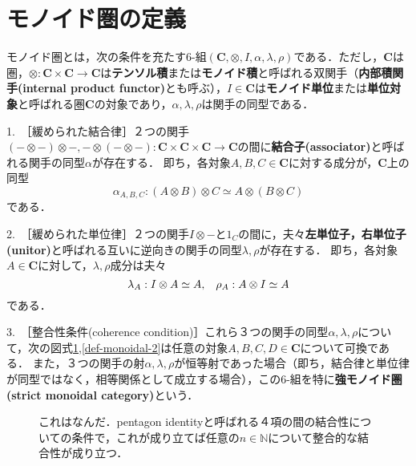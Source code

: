 \documentclass[uplatex, dvipdfmx]{jsreport}
\begin{document}
\section{モノイド圏の定義}
\begin{definition}\rm{}
    モノイド圏とは，次の条件を充たす6-組$(\mathbf{C},\otimes,I,\alpha,\lambda,\rho)$である．ただし，$\mathbf{C}$は圏，$\otimes:\mathbf{C}\times \mathbf{C}\to \mathbf{C}$は\textbf{テンソル積}または\textbf{モノイド積}と呼ばれる双関手（\textbf{内部積関手(internal product functor)}とも呼ぶ），$I\in \mathbf{C}$は\textbf{モノイド単位}または\textbf{単位対象}と呼ばれる圏$\mathbf{C}$の対象であり，$\alpha,\lambda,\rho$は関手の同型である．

    1.\, ［緩められた結合律］２つの関手$(-\otimes -)\otimes -,-\otimes (-\otimes -):\mathbf{C}\times \mathbf{C}\times \mathbf{C}\to \mathbf{C}$の間に\textbf{結合子(associator)}と呼ばれる関手の同型$\alpha$が存在する．
    即ち，各対象$A,B,C\in\mathbf{C}$に対する成分が，$\mathbf{C}$上の同型$$\alpha_{A,B,C}:(A\otimes B)\otimes C\simeq A\otimes (B\otimes C)$$である．

    2.\, ［緩められた単位律］２つの関手$I\otimes -$と$1_C$の間に，夫々\textbf{左単位子，右単位子(unitor)}と呼ばれる互いに逆向きの関手の同型$\lambda,\rho$が存在する．
    即ち，各対象$A\in\mathbf{C}$に対して，$\lambda,\rho$成分は夫々$$\lambda_A:I\otimes A\simeq A,\hspace{3mm}\rho_A:A\otimes I\simeq A$$である．

    3.\, ［整合性条件(coherence condition)］これら３つの関手の同型$\alpha,\lambda,\rho$について，次の図式\ref{def-monoidal-1},\ref{def-monoidal-2}は任意の対象$A,B,C,D\in\mathbf{C}$について可換である．
    また，３つの関手の射$\alpha,\lambda,\rho$が恒等射であった場合（即ち，結合律と単位律が同型ではなく，相等関係として成立する場合），この6-組を特に\textbf{強モノイド圏(strict monoidal category)}という．
\end{definition}
\begin{figure}[h]\begin{center}\caption{これはなんだ．pentagon identityと呼ばれる４項の間の結合性についての条件で，これが成り立てば任意の$n\in\mathbb{N}$について整合的な結合性が成り立つ．\label{def-monoidal-1}}
\end{center}\end{figure}
\end{document}
